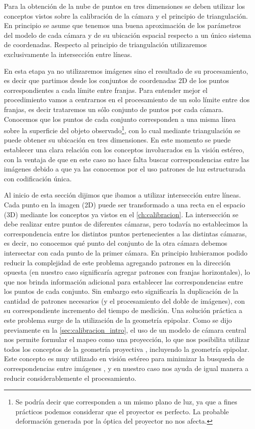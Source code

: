 Para la obtención de la nube de puntos en tres dimensiones se deben utilizar los conceptos vistos sobre la calibración de la cámara y el principio de triangulación. En principio se asume que tenemos una buena aproximación de los parámetros del modelo de cada cámara y de su ubicación espacial respecto a un único sistema de coordenadas. Respecto al principio de triangulación utilizaremos exclusivamente la intersección entre líneas.

En esta etapa ya no utilizaremos imágenes sino el resultado de su procesamiento, es decir que partimos desde los conjuntos de coordenadas 2D de los puntos correspondientes a cada límite entre franjas. Para entender mejor el procedimiento vamos a centrarnos en el procesamiento de un solo límite entre dos franjas, es decir trataremos un sólo conjunto de puntos por cada cámara.
Conocemos que los puntos de cada conjunto corresponden a una misma línea sobre la superficie del objeto observado\footnote{Se podría decir que corresponden a un mismo plano de luz, ya que a fines prácticos podemos considerar que el proyector es perfecto. La probable deformación generada por la óptica del proyector no nos afecta.}, con lo cual mediante triangulación se puede obtener su ubicación en tres dimensiones. En este momento se puede establecer una clara relación con los conceptos involucrados en la visión estéreo, con la ventaja de que en este caso no hace falta buscar correspondencias entre las imágenes debido a que ya las conocemos por el uso patrones de luz estructurada con codificación única.

Al inicio de esta sección dijimos que ibamos a utilizar intersección entre líneas. Cada punto en la imagen (2D) puede ser transformado a una recta en el espacio (3D) mediante los conceptos ya vistos en el \autoref{ch:calibracion}. La intersección se debe realizar entre puntos de diferentes cámaras, pero todavía no establecimos la correspondencia entre los distintos puntos pertenecientes a las distintas cámaras, es decir, no conocemos qué punto del conjunto de la otra cámara debemos intersectar con cada punto de la primer cámara. 
En principio hubieramos podido reducir la complejidad de este problema agregando patrones en la dirección opuesta (en nuestro caso significaría agregar patrones con franjas horizontales), lo que nos brinda información adicional para establecer las correspondencias entre los puntos de cada conjunto. Sin embargo esto significaría la duplicación de la cantidad de patrones necesarios (y el procesamiento del doble de imágenes), con su correspondiente incremento del tiempo de medición.
Una solución práctica a este problema surge de la utilización de la geometría epipolar. Como se dijo previamente en la \autoref{sec:calibracion_intro}, el uso de un modelo de cámara central nos permite formular el mapeo como una proyección, lo que nos posibilita utilizar todos los conceptos de la geometría proyectiva \cite{hanning2011high}, incluyendo la geometría epipolar. Este concepto es muy utilizado en visión estéreo para minimizar la busqueda de correspondencias entre imágenes \cite{bradski2008learning}, y en nuestro caso nos ayuda de igual manera a reducir considerablemente el procesamiento.

